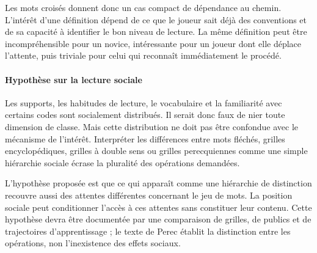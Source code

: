 \documentclass[10pt,a4paper]{article}
\begin{document}
Les mots croisés donnent donc un cas compact de dépendance au chemin. L'intérêt d'une définition dépend de ce que le joueur sait déjà des conventions et de sa capacité à identifier le bon niveau de lecture. La même définition peut être incompréhensible pour un novice, intéressante pour un joueur dont elle déplace l'attente, puis triviale pour celui qui reconnaît immédiatement le procédé.

\paragraph{Hypothèse sur la lecture sociale}
Les supports, les habitudes de lecture, le vocabulaire et la familiarité avec certains codes sont socialement distribués. Il serait donc faux de nier toute dimension de classe. Mais cette distribution ne doit pas être confondue avec le mécanisme de l'intérêt. Interpréter les différences entre mots fléchés, grilles encyclopédiques, grilles à double sens ou grilles perecquiennes comme une simple hiérarchie sociale écrase la pluralité des opérations demandées.

L'hypothèse proposée est que ce qui apparaît comme une hiérarchie de distinction recouvre aussi des attentes différentes concernant le jeu de mots. La position sociale peut conditionner l'accès à ces attentes sans constituer leur contenu. Cette hypothèse devra être documentée par une comparaison de grilles, de publics et de trajectoires d'apprentissage ; le texte de Perec établit la distinction entre les opérations, non l'inexistence des effets sociaux.
\end{document}
